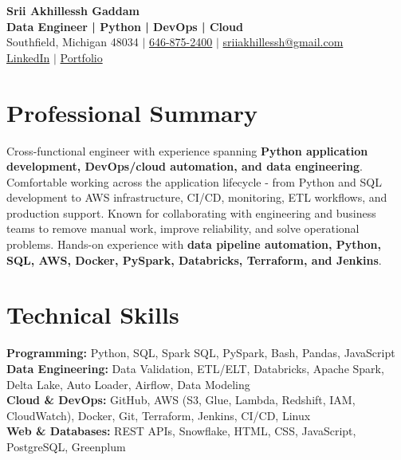 \documentclass[letterpaper,10pt]{article}
\begin{document}
\fontsize{9.35pt}{10.45pt}\selectfont

\begin{center}
    {\LARGE \textbf{Srii Akhillessh Gaddam}} \\[-1pt]
    \textbf{Data Engineer | Python | DevOps | Cloud} \\[2pt]
    Southfield, Michigan 48034 $|$
    \href{tel:6468752400}{646-875-2400} $|$
    \href{mailto:sriiakhillessh@gmail.com}{sriiakhillessh@gmail.com} \\[1pt]
    \href{https://www.linkedin.com/in/srii-akhiilessh-gaddam-b48668191/}{LinkedIn} $|$
    \href{https://sriiakhillesshg.github.io/portfolio/}{Portfolio}
\end{center}
\vspace{-8pt}

\section{Professional Summary}
\small{Cross-functional engineer with experience spanning \textbf{Python application development, DevOps/cloud automation, and data engineering}. Comfortable working across the application lifecycle - from Python and SQL development to AWS infrastructure, CI/CD, monitoring, ETL workflows, and production support. Known for collaborating with engineering and business teams to remove manual work, improve reliability, and solve operational problems. Hands-on experience with \textbf{data pipeline automation, Python, SQL, AWS, Docker, PySpark, Databricks, Terraform, and Jenkins}.}

\section{Technical Skills}
\small{
\textbf{Programming:} Python, SQL, Spark SQL, PySpark, Bash, Pandas, JavaScript \\
\textbf{Data Engineering:} Data Validation, ETL/ELT, Databricks, Apache Spark, Delta Lake, Auto Loader, Airflow, Data Modeling \\
\textbf{Cloud \& DevOps:} GitHub, AWS (S3, Glue, Lambda, Redshift, IAM, CloudWatch), Docker, Git, Terraform, Jenkins, CI/CD, Linux \\
\textbf{Web \& Databases:} REST APIs, Snowflake, HTML, CSS, JavaScript, PostgreSQL, Greenplum
}

\end{document}

